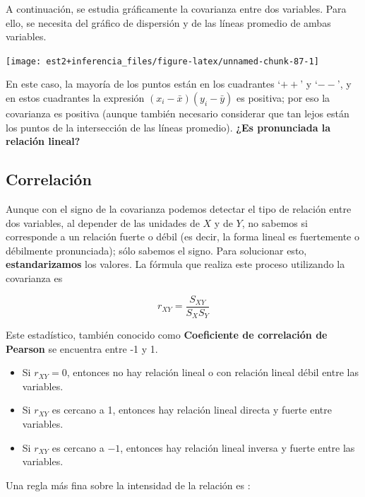 \documentclass[
  11pt,
]{book}
\theoremstyle{definition}
\theoremstyle{definition}
\theoremstyle{definition}
\theoremstyle{definition}
\theoremstyle{remark}
\begin{document}
A continuación, se estudia gráficamente la covarianza entre dos variables. Para ello, se necesita del gráfico de dispersión y de las líneas promedio de ambas variables.

\begin{center}\texttt{[image: est2+inferencia\_files/figure-latex/unnamed-chunk-87-1]} \end{center}

En este caso, la mayoría de los puntos están en los cuadrantes `\(+ +\)' y `\(- -\)', y en estos cuadrantes la expresión \((x_i-\bar{x})(y_i-\bar{y})\) es positiva; por eso la covarianza es positiva (aunque también necesario considerar que tan lejos están los puntos de la intersección de las líneas promedio). \textbf{¿Es pronunciada la relación lineal?}

\subsection{Correlación}\label{regresion-lineal-correlacion}

Aunque con el signo de la covarianza podemos detectar el tipo de relación entre dos variables, al depender de las unidades de \(X\) y de \(Y\), no sabemos si corresponde a un relación fuerte o débil (es decir, la forma lineal es fuertemente o débilmente pronunciada); sólo sabemos el signo. Para solucionar esto, \textbf{estandarizamos} los valores. La fórmula que realiza este proceso utilizando la covarianza es

\begin{equation}
r_{XY} = \frac{S_{XY}}{S_{X}S_{Y}}
\label{eq:Correlacion}
\end{equation}

Este estadístico, también conocido como \textbf{Coeficiente de correlación de Pearson} se encuentra entre -1 y 1.

\begin{itemize}
\item
  Si \(r_{XY} = 0\), entonces no hay relación lineal o con relación lineal débil entre las variables.
\item
  Si \(r_{XY}\) es cercano a 1, entonces hay relación lineal directa y fuerte entre variables.
\item
  Si \(r_{XY}\) es cercano a \(-1\), entonces hay relación lineal inversa y fuerte entre las variables.
\end{itemize}

Una regla más fina sobre la intensidad de la relación es \citep{ratner_correlation_2009}:
\end{document}
